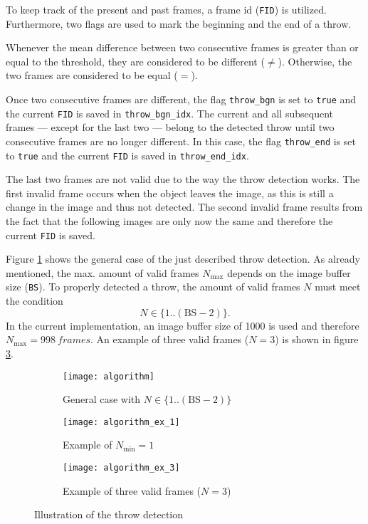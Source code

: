 To keep track of the present and past frames, a frame id (\texttt{FID}) is utilized.
Furthermore, two flags are used to mark the beginning and the end of a throw.

Whenever the mean difference between two consecutive frames is greater than or equal to the threshold, they are considered to be different ($\ne$).
Otherwise, the two frames are considered to be equal ($=$).

Once two consecutive frames are different, the flag \texttt{throw\_bgn} is set to \texttt{true} and the current \texttt{FID} is saved in \texttt{throw\_bgn\_idx}.
The current and all subsequent frames --- except for the last two --- belong to the detected throw until two consecutive frames are no longer different.
In this case, the flag \texttt{throw\_end} is set to \texttt{true} and the current \texttt{FID} is saved in \texttt{throw\_end\_idx}.

The last two frames are not valid due to the way the throw detection works.
The first invalid frame occurs when the object leaves the image, as this is still a change in the image and thus not detected.
The second invalid frame results from the fact that the following images are only now the same and therefore the current \texttt{FID} is saved.

Figure \ref{subfig:algorithm_general_case} shows the general case of the just described throw detection.
As already mentioned, the max. amount of valid frames $N_\text{max}$ depends on the image buffer size (\texttt{BS}).
To properly detected a throw, the amount of valid frames $N$ must meet the condition
\[
  N \in \{1..(\text{BS}-2)\}.
\]
In the current implementation, an image buffer size of \SI{1000}{} is used and therefore $N_\text{max} = \SI{998}{frames}$.
An example of three valid frames ($N = 3$) is shown in figure \ref{subfig:algorithm_example_3}.

\begin{figure}[h]
  \centering
  \begin{subfigure}[b]{\textwidth}
    \texttt{[image: algorithm]}
    \caption{General case with $N \in \{1..(\text{BS}-2)\}$}
    \label{subfig:algorithm_general_case}
  \end{subfigure}
  \begin{subfigure}[b]{\textwidth}
    \texttt{[image: algorithm\_ex\_1]}
    \caption{Example of $N_\text{min} = 1$}
    \label{subfig:algorithm_example_1}
  \end{subfigure}
  \begin{subfigure}[b]{\textwidth}
    \texttt{[image: algorithm\_ex\_3]}
    \caption{Example of three valid frames ($N = 3$)}
    \label{subfig:algorithm_example_3}
  \end{subfigure}
  \caption{Illustration of the throw detection}
  \label{fig:throw_detection}
\end{figure}
